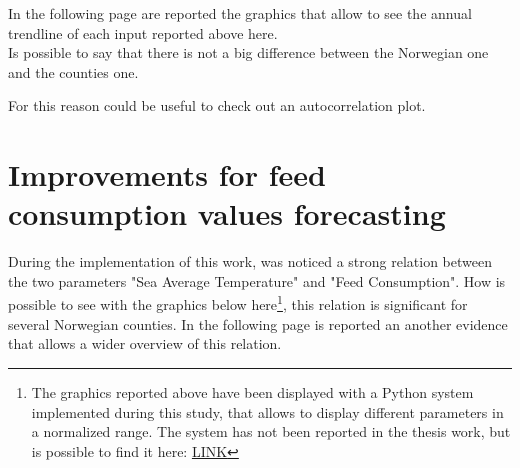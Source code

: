  \begin{table}[ht]
         \caption{Comparison between Evaluation MAPE and Prediction MAPE}   
   \label{table: MAPE_Comparison} 
\end{table}     


In the following page are reported the graphics that allow to see the annual trendline of each input reported above here.\\ 
Is possible to say that there is not a big difference between the Norwegian one and the counties one.

For this reason could be useful to check out an autocorrelation plot.

\newpage

\section{Improvements for feed consumption values forecasting }
During the implementation of this work, was noticed a strong relation between the two parameters "Sea Average Temperature" and "Feed Consumption". How is possible to see with the graphics below here\footnote{The graphics reported above have been displayed with a Python system implemented during this study, that allows to display different parameters in a normalized range. The system has not been reported in the thesis work, but is possible to find it here: \url{LINK}}, this relation is significant for several Norwegian counties.
In the following page is reported an another evidence that allows a wider overview of this relation.
\vspace{-5mm}

